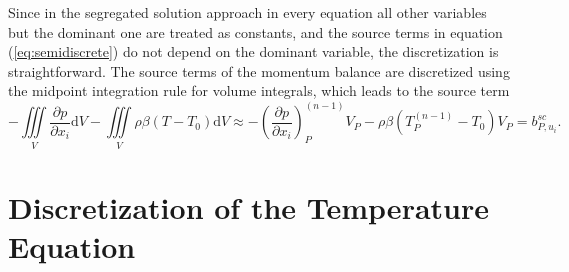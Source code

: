 Since in the segregated solution approach in every equation all other variables but the dominant one are treated as constants, and the source terms in equation (\ref{eq:semidiscrete}) do not depend on the dominant variable, the discretization is straightforward. The source terms of the momentum balance are discretized using the midpoint integration rule for volume integrals, which leads to the source term
\begin{displaymath}
  - \iiint\limits_V \frac{\partial p}{\partial x_i} \mathrm{d}V
  - \iiint\limits_V \rho \beta \left(T - T_0\right) \mathrm{d}V
  \approx
  - \left(\frac{\partial p}{\partial x_i}\right)_P^{(n-1)} V_P
  - \rho \beta \left(T_P^{(n-1)} - T_0\right) V_P
  = b_{P,u_i}^{sc}.
\end{displaymath}

\section{Discretization of the Temperature Equation}
\label{sec:discretetemperature}

